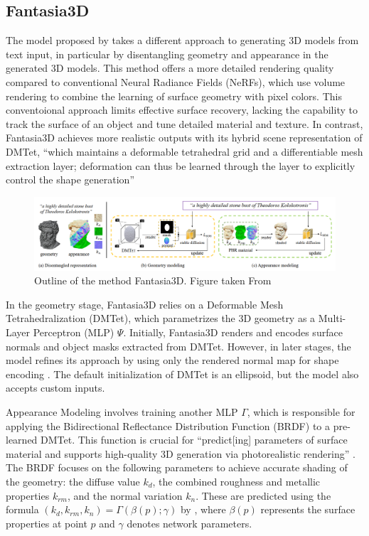 \subsection{Fantasia3D}\label{fantasia3D}

The model proposed by \citeauthor{chen2023fantasia3d} takes a different approach to generating 3D models from text input, in particular by disentangling geometry and appearance in the generated 3D models.
This method offers a more detailed rendering quality compared to conventional Neural Radiance Fields (NeRFs), which use volume rendering to combine the learning of surface geometry with pixel colors. This conventoional approach limits effective surface recovery, lacking the capability to track the surface of an object and tune detailed material and texture. In contrast, Fantasia3D achieves more realistic outputs with its hybrid scene representation of DMTet, ``which maintains a deformable tetrahedral grid and a differentiable mesh extraction layer; deformation can thus be learned through the layer to explicitly control the shape generation'' \citep{chen2023fantasia3d}

\begin{figure}[ht]
  \centering
    \includegraphics[width=1\columnwidth]{figures/Fantasia3D.png}
    \caption{Outline of the method Fantasia3D. Figure taken From \citep{chen2023fantasia3d}}\label{fig:figureFantasia}
\end{figure}

In the geometry stage, Fantasia3D relies on a Deformable Mesh Tetrahedralization (DMTet), which parametrizes the 3D geometry as a Multi-Layer Perceptron (MLP) \(\Psi\). Initially, Fantasia3D renders and encodes surface normals and object masks extracted from DMTet. However, in later stages, the model refines its approach by using only the rendered normal map for shape encoding \citep{chen2023fantasia3d}. The default initialization of DMTet is an ellipsoid, but the model also accepts custom inputs.

Appearance Modeling involves training another MLP \( \Gamma \), which is responsible for applying the Bidirectional Reflectance Distribution Function (BRDF) \citep{chen2023fantasia3d} to a pre-learned DMTet. This function is crucial for ``predict[ing] parameters of surface material and supports high-quality 3D generation via photorealistic rendering'' \citep{chen2023fantasia3d}. The BRDF focuses on the following parameters to achieve accurate shading of the geometry: the diffuse value \(k_d\), the combined roughness and metallic properties \(k_{rm}\), and the normal variation \(k_n\). These are predicted using the formula \((k_d, k_{rm}, k_n) = \Gamma(\beta(p); \gamma)\) by \citeauthor{chen2023fantasia3d}, where \(\beta(p)\) represents the surface properties at point \(p\) and \(\gamma\) denotes network parameters.

